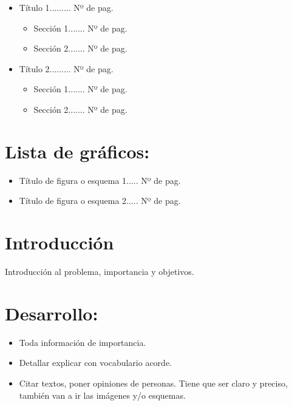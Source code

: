 \documentclass[12pt]{article}
\begin{document}
{{\begin{minipage}[c][\paperheight]{\paperwidth}
\begin{itemize}
    \item Título 1......... Nº de pag.
        \begin{itemize}
            \item Sección 1....... Nº de pag.
            \item Sección 2....... Nº de pag.
        \end{itemize}
    \item Título 2......... Nº de pag.
    \begin{itemize}
        \item Sección 1....... Nº de pag.
        \item Sección 2....... Nº de pag.
    \end{itemize}
\end{itemize}

\section*{Lista de gráficos:}

\begin{itemize}

    \item Título de figura o esquema 1..... Nº de pag.

    \item Título de figura o esquema 2..... Nº de pag.

\end{itemize}

\section*{Introducción}

Introducción al problema, importancia y objetivos.

\section*{Desarrollo:}
\begin{itemize}

    \item Toda información de importancia.

    \item Detallar explicar con vocabulario acorde. 

    \item Citar textos, poner opiniones de personas. Tiene que ser claro y
        preciso, también van a ir las imágenes y/o esquemas.


\end{itemize}
\end{minipage}}}
\end{document}
